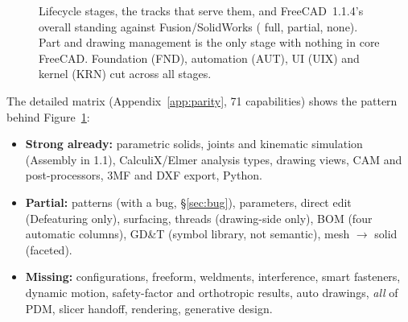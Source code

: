 \begin{figure}[ht]
\centering
{}
\caption{Lifecycle stages, the tracks that serve them, and FreeCAD~1.1.4's overall standing against
Fusion/SolidWorks (\pfull{} full, \phalf{} partial, \pnone{} none). Part and drawing management is the only
stage with nothing in core FreeCAD. Foundation (FND), automation (AUT), UI (UIX) and kernel (KRN) cut across
all stages.}
\label{fig:lifecycle}
\end{figure}

The detailed matrix (Appendix~\ref{app:parity}, 71 capabilities) shows the pattern behind
Figure~\ref{fig:lifecycle}:
\begin{itemize}
  \item \textbf{Strong already:} parametric solids, joints and kinematic simulation (Assembly in 1.1),
        CalculiX/Elmer analysis types, drawing views, CAM and post-processors, 3MF and DXF export, Python.
  \item \textbf{Partial:} patterns (with a bug, \S\ref{sec:bug}), parameters, direct edit (Defeaturing only),
        surfacing, threads (drawing-side only), BOM (four automatic columns), GD\&T (symbol library, not
        semantic), mesh $\rightarrow$ solid (faceted).
  \item \textbf{Missing:} configurations, freeform, weldments, interference, smart fasteners, dynamic
        motion, safety-factor and orthotropic results, auto drawings, \emph{all} of PDM, slicer handoff,
        rendering, generative design.
\end{itemize}

